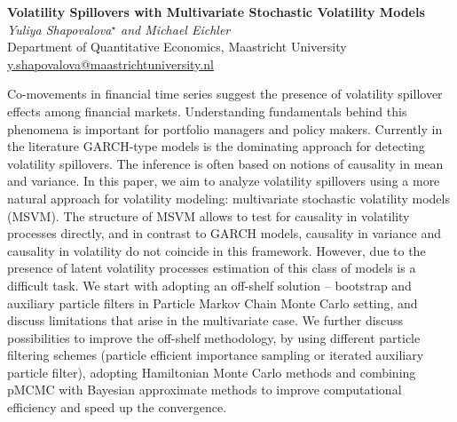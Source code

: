\documentclass[12pt]{article}
\newcommand{\postertitle}[1]{{\Large\bf #1}\\[12pt]}
\newcommand{\authors}[1]{\emph{#1}\\}
\newcommand{\affiliations}[1]{{#1}\\}
\newcommand{\contacts}[1]{{#1}}
\begin{document}
\begin{center}
\vspace*{0.5cm}
%
\postertitle{Volatility Spillovers with Multivariate Stochastic Volatility Models}
%
\authors{Yuliya Shapovalova$^\star$ and Michael Eichler} %
% 
\affiliations{Department of Quantitative Economics, Maastricht University}
%
\contacts{\url{y.shapovalova@maastrichtuniversity.nl}} %
%
\vspace*{0.3cm}
\end{center}

Co-movements in financial time series suggest the presence of volatility spillover effects among financial
markets. Understanding fundamentals behind this phenomena is important for portfolio
managers and policy makers. Currently in the literature GARCH-type models is the dominating
approach for detecting volatility spillovers. The inference is often based on notions of causality
in mean and variance. In this paper, we aim to analyze volatility spillovers using a more natural
approach for volatility modeling: multivariate stochastic volatility models (MSVM). The
structure of MSVM allows to test for causality in volatility processes directly, and in contrast to
GARCH models, causality in variance and causality in volatility do not coincide in this framework.
However, due to the presence of latent volatility processes estimation of this class of
models is a difficult task. We start with adopting an off-shelf solution – bootstrap and auxiliary
particle filters in Particle Markov Chain Monte Carlo setting, and discuss limitations that arise
in the multivariate case. We further discuss possibilities to improve the off-shelf methodology,
by using different particle filtering schemes (particle efficient importance sampling or iterated
auxiliary particle filter), adopting Hamiltonian Monte Carlo methods and combining pMCMC 
with Bayesian approximate methods to
improve computational efficiency and speed up the convergence.


\end{document}

